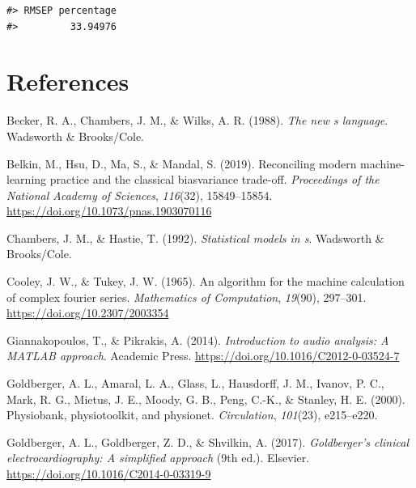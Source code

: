 \documentclass[
]{article}
\newlength{\cslhangindent}
\newlength{\cslentryspacingunit} %
\newenvironment{CSLReferences}[2] %
 {%
  \setlength{\parindent}{0pt}
  \ifodd #1
  \let\oldpar\par
  \def\par{\hangindent=\cslhangindent\oldpar}
  \fi
  \setlength{\parskip}{#2\cslentryspacingunit}
 }%
 {}
\begin{document}
\begin{verbatim}
#> RMSEP percentage 
#>         33.94976
\end{verbatim}

\newpage

\hypertarget{references}{%
\section*{References}\label{references}}

\hypertarget{refs}{}
\begin{CSLReferences}{1}{1}
\leavevmode{}%
Becker, R. A., Chambers, J. M., \& Wilks, A. R. (1988). \emph{The new s
language}. Wadsworth \& Brooks/Cole.

\leavevmode{}%
Belkin, M., Hsu, D., Ma, S., \& Mandal, S. (2019). Reconciling modern
machine-learning practice and the classical bias{\textendash}variance
trade-off. \emph{Proceedings of the National Academy of Sciences},
\emph{116}(32), 15849--15854.
\url{https://doi.org/10.1073/pnas.1903070116}

\leavevmode{}%
Chambers, J. M., \& Hastie, T. (1992). \emph{Statistical models in s}.
{Wadsworth \& Brooks/Cole}.

\leavevmode{}%
Cooley, J. W., \& Tukey, J. W. (1965). An algorithm for the machine
calculation of complex fourier series. \emph{Mathematics of
Computation}, \emph{19}(90), 297--301.
\url{https://doi.org/10.2307/2003354}

\leavevmode{}%
Giannakopoulos, T., \& Pikrakis, A. (2014). \emph{Introduction to audio
analysis: A MATLAB approach}. Academic Press.
\url{https://doi.org/10.1016/C2012-0-03524-7}

\leavevmode{}%
Goldberger, A. L., Amaral, L. A., Glass, L., Hausdorff, J. M., Ivanov,
P. C., Mark, R. G., Mietus, J. E., Moody, G. B., Peng, C.-K., \&
Stanley, H. E. (2000). Physiobank, physiotoolkit, and physionet.
\emph{Circulation}, \emph{101}(23), e215--e220.

\leavevmode{}%
Goldberger, A. L., Goldberger, Z. D., \& Shvilkin, A. (2017).
\emph{Goldberger's clinical electrocardiography: A simplified approach}
(9th ed.). Elsevier. \url{https://doi.org/10.1016/C2014-0-03319-9}


\end{CSLReferences}
\end{document}
